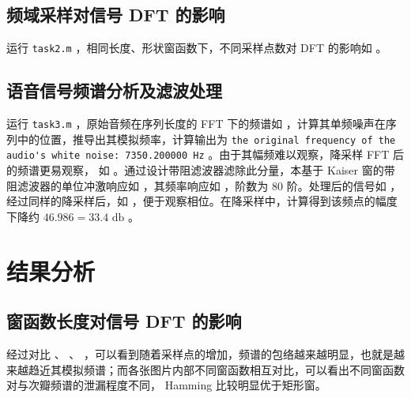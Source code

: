 \documentclass[lang=cn,11pt,a4paper,cite=authoryear]{elegantpaper}
\begin{document}

\subsection{频域采样对信号 DFT 的影响}

运行 \lstinline{task2.m} ，相同长度、形状窗函数下，不同采样点数对 DFT 的影响如  。


\subsection{语音信号频谱分析及滤波处理}

运行 \lstinline{task3.m} ，原始音频在序列长度的 FFT 下的频谱如  ，计算其单频噪声在序列中的位置，推导出其模拟频率，计算输出为 \lstinline{the original frequency of the audio's white noise: 7350.200000 Hz} 。由于其幅频难以观察，降采样 FFT 后的频谱更易观察， 如  。通过设计带阻滤波器滤除此分量，本基于 Kaiser 窗的带阻滤波器的单位冲激响应如  ，其频率响应如  ，阶数为 80 阶。处理后的信号如  ，经过同样的降采样后，如  ，便于观察相位。在降采样中，计算得到该频点的幅度下降约 \(46.986 = 33.4 \text{ db}\) 。







\section{结果分析}


\subsection{窗函数长度对信号 DFT 的影响}

经过对比  、  、 ，可以看到随着采样点的增加，频谱的包络越来越明显，也就是越来越趋近其模拟频谱；而各张图片内部不同窗函数相互对比，可以看出不同窗函数对与次瓣频谱的泄漏程度不同， Hamming 比较明显优于矩形窗。
\end{document}
